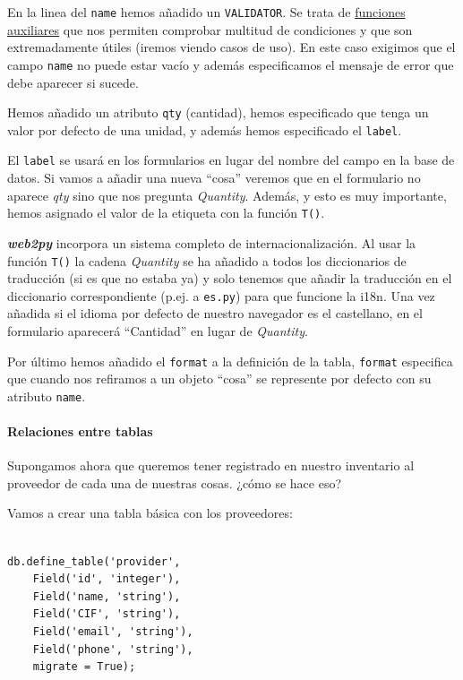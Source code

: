 \documentclass[
  12pt,
  spanish,
]{article}
\begin{document}
En la linea del \texttt{name} hemos añadido un \texttt{VALIDATOR}. Se
trata de
\href{http://web2py.com/books/default/chapter/29/07/forms-and-validators}{funciones
auxiliares} que nos permiten comprobar multitud de condiciones y que son
extremadamente útiles (iremos viendo casos de uso). En este caso
exigimos que el campo \texttt{name} no puede estar vacío y además
especificamos el mensaje de error que debe aparecer si sucede.

Hemos añadido un atributo \texttt{qty} (cantidad), hemos especificado
que tenga un valor por defecto de una unidad, y además hemos
especificado el \texttt{label}.

El \texttt{label} se usará en los formularios en lugar del nombre del
campo en la base de datos. Si vamos a añadir una nueva ``cosa'' veremos
que en el formulario no aparece \emph{qty} sino que nos pregunta
\emph{Quantity}. Además, y esto es muy importante, hemos asignado el
valor de la etiqueta con la función \texttt{T()}.

\textbf{\emph{web2py}} incorpora un sistema completo de
internacionalización. Al usar la función \texttt{T()} la cadena
\emph{Quantity} se ha añadido a todos los diccionarios de traducción (si
es que no estaba ya) y solo tenemos que añadir la traducción en el
diccionario correspondiente (p.ej. a \texttt{es.py}) para que funcione
la i18n. Una vez añadida si el idioma por defecto de nuestro navegador
es el castellano, en el formulario aparecerá ``Cantidad'' en lugar de
\emph{Quantity}.

Por último hemos añadido el \texttt{format} a la definición de la tabla,
\texttt{format} especifica que cuando nos refiramos a un objeto ``cosa''
se represente por defecto con su atributo \texttt{name}.

\hypertarget{relaciones-entre-tablas}{%
\paragraph{Relaciones entre tablas}\label{relaciones-entre-tablas}}

Supongamos ahora que queremos tener registrado en nuestro inventario al
proveedor de cada una de nuestras cosas. ¿cómo se hace eso?

Vamos a crear una tabla básica con los proveedores:

\begin{verbatim}

db.define_table('provider',
    Field('id', 'integer'),
    Field('name, 'string'),
    Field('CIF', 'string'),
    Field('email', 'string'),
    Field('phone', 'string'),
    migrate = True);
\end{verbatim}
\end{document}
